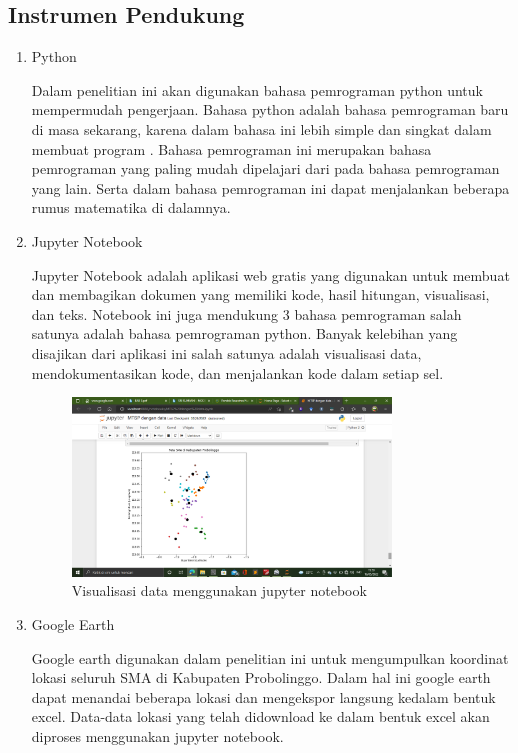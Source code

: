 \subsection{Instrumen Pendukung}
\begin{enumerate}
    \item Python
    
    Dalam penelitian ini akan digunakan bahasa pemrograman python untuk mempermudah pengerjaan. Bahasa python adalah bahasa pemrograman baru di masa sekarang, karena dalam bahasa ini lebih simple dan singkat dalam membuat program \cite{syahrudin2018input}. Bahasa pemrograman ini merupakan bahasa pemrograman yang paling mudah dipelajari dari pada bahasa pemrograman yang lain. Serta dalam bahasa pemrograman ini dapat menjalankan beberapa rumus matematika di dalamnya.
    
    \item Jupyter Notebook
    
    Jupyter Notebook adalah aplikasi web gratis yang digunakan untuk membuat dan membagikan dokumen yang memiliki kode, hasil hitungan, visualisasi, dan teks. Notebook ini juga mendukung 3 bahasa pemrograman salah satunya adalah bahasa pemrograman python. Banyak kelebihan yang disajikan dari aplikasi ini salah satunya adalah visualisasi data, mendokumentasikan kode, dan menjalankan kode dalam setiap sel.

\begin{figure}[h!]
  \centering
  \includegraphics[width=0.8\textwidth]{visualisasi jupyter.png}
  \caption{Visualisasi data menggunakan jupyter notebook}
\end{figure}

	\item Google Earth
	
	Google earth digunakan dalam penelitian ini untuk mengumpulkan koordinat lokasi seluruh SMA di Kabupaten Probolinggo. Dalam hal ini google earth dapat menandai beberapa lokasi dan mengekspor langsung kedalam bentuk excel. Data-data lokasi yang telah didownload ke dalam bentuk excel akan diproses menggunakan jupyter notebook.


\end{enumerate}
